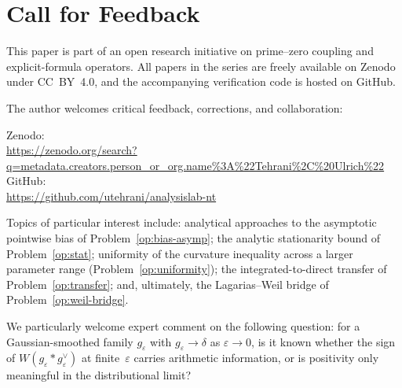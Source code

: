 \documentclass[11pt]{article}
\begin{document}
\section*{Call for Feedback}

This paper is part of an open research initiative on prime--zero
coupling and explicit-formula operators.
All papers in the series are freely available on Zenodo under CC~BY~4.0,
and the accompanying verification code is hosted on GitHub.

The author welcomes critical feedback, corrections, and collaboration:

{\raggedright
Zenodo:\\
\url{https://zenodo.org/search?q=metadata.creators.person_or_org.name\%3A\%22Tehrani\%2C\%20Ulrich\%22}\\
GitHub:\\
\url{https://github.com/utehrani/analysislab-nt}
\par}

Topics of particular interest include: analytical approaches to the
asymptotic pointwise bias of Problem~\ref{op:bias-asymp}; the analytic
stationarity bound of Problem~\ref{op:stat}; uniformity of the
curvature inequality across a larger parameter range
(Problem~\ref{op:uniformity}); the integrated-to-direct transfer of
Problem~\ref{op:transfer}; and, ultimately, the Lagarias--Weil bridge
of Problem~\ref{op:weil-bridge}.

We particularly welcome expert comment on the following question:
for a Gaussian-smoothed family $g_\varepsilon$ with
$g_\varepsilon\to\delta$ as $\varepsilon\to 0$, is it known whether
the sign of $W(g_\varepsilon * g_\varepsilon^\vee)$ at
finite~$\varepsilon$ carries arithmetic information, or is positivity
only meaningful in the distributional limit?
\end{document}
